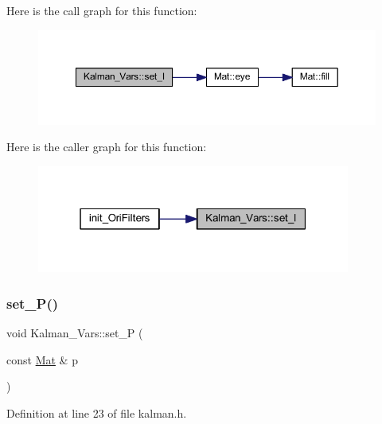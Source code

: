 Here is the call graph for this function\+:
\nopagebreak
\begin{figure}[H]
\begin{center}
\leavevmode
\includegraphics[width=350pt]{struct_kalman___vars_a9c818fcb9d72defe273c99a5378319ee_cgraph}
\end{center}
\end{figure}
Here is the caller graph for this function\+:
\nopagebreak
\begin{figure}[H]
\begin{center}
\leavevmode
\includegraphics[width=292pt]{struct_kalman___vars_a9c818fcb9d72defe273c99a5378319ee_icgraph}
\end{center}
\end{figure}
\mbox{\label{struct_kalman___vars_a5c294937351709594ffc9c41cb183087}} 
\subsubsection{\texorpdfstring{set\_P()}{set\_P()}}
{\footnotesize\ttfamily void Kalman\+\_\+\+Vars\+::set\+\_\+P (\begin{DoxyParamCaption}\item[{const \mbox{\hyperlink{class_mat}{Mat}} \&}]{p }\end{DoxyParamCaption})\hspace{0.3cm}{\ttfamily [inline]}}



Definition at line 23 of file kalman.\+h.

